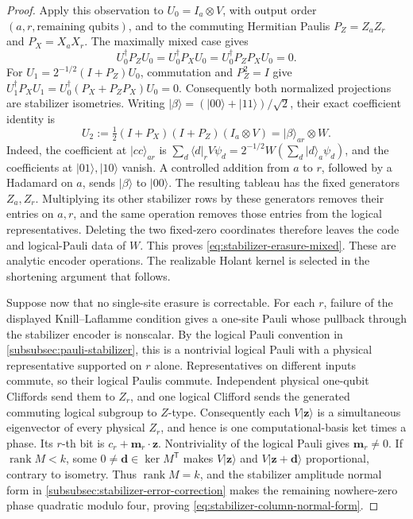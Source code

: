 \documentclass[11pt,letterpaper,onecolumn]{article}
\theoremstyle{plain}
\theoremstyle{definition}
\theoremstyle{remark}
\newcommand{\rank}{\operatorname{rank}}
\begin{document}
\begin{proof}
Apply this observation to \(U_0=I_a\otimes V\), with output order
\((a,r,\text{remaining qubits})\), and to the commuting Hermitian Paulis
\(P_Z=Z_aZ_r\) and \(P_X=X_aX_r\).  The maximally mixed case gives
\[
 U_0^\dagger P_ZU_0=U_0^\dagger P_XU_0
 =U_0^\dagger P_ZP_XU_0=0.
\]
For \(U_1=2^{-1/2}(I+P_Z)U_0\), commutation and \(P_Z^2=I\) give
\(U_1^\dagger P_XU_1=U_0^\dagger(P_X+P_ZP_X)U_0=0\).
Consequently both normalized projections are stabilizer isometries.
Writing \(\lvert\beta\rangle=(\lvert00\rangle+\lvert11\rangle)/\sqrt2\),
their exact coefficient identity is
\[
 U_2:=\tfrac12(I+P_X)(I+P_Z)(I_a\otimes V)
      =\lvert\beta\rangle_{ar}\otimes W.
\]
Indeed, the coefficient at \(\lvert cc\rangle_{ar}\) is
\(\sum_d\langle d\rvert_rV\psi_d
 =2^{-1/2}W(\sum_d\lvert d\rangle_a\psi_d)\),
and the coefficients at \(\lvert01\rangle,\lvert10\rangle\) vanish.
A controlled addition from \(a\) to \(r\), followed by a Hadamard on
\(a\), sends \(\lvert\beta\rangle\) to \(\lvert00\rangle\).
The resulting tableau has the fixed generators \(Z_a,Z_r\).
Multiplying its other stabilizer rows by these generators removes their
entries on \(a,r\), and the same operation removes those entries from
the logical representatives.  Deleting the two fixed-zero coordinates
therefore leaves the code and logical-Pauli data of \(W\).
This proves \cref{eq:stabilizer-erasure-mixed}.  These are analytic encoder
operations. The realizable Holant kernel is selected in the shortening
argument that follows.

Suppose now that no single-site erasure is correctable.  For each \(r\),
failure of the displayed Knill--Laflamme condition gives a one-site Pauli
whose pullback through the stabilizer encoder is nonscalar.  By the logical
Pauli convention in \cref{subsubsec:pauli-stabilizer}, this
is a nontrivial logical Pauli with a physical representative supported on
\(r\) alone.  Representatives on
different inputs commute, so their logical Paulis commute.  Independent
physical one-qubit Cliffords send them to \(Z_r\), and one logical Clifford
sends the generated commuting logical subgroup to \(Z\)-type.  Consequently
each \(V\lvert {\mathbf z}\rangle\) is a simultaneous eigenvector of every physical
\(Z_r\), and hence is one computational-basis ket times a phase.  Its
\(r\)-th bit is \(c_r+{\mathbf{m}}_r\cdot {\mathbf z}\). Nontriviality of the logical Pauli gives
\({\mathbf{m}}_r\ne0\).  If \(\rank M<k\), some
\(0\ne {\mathbf d}\in\ker M^{\mathsf T}\) makes \(V\lvert {\mathbf z}\rangle\) and
\(V\lvert {\mathbf z}+{\mathbf d}\rangle\) proportional, contrary to
isometry.  Thus \(\rank M=k\), and the stabilizer amplitude normal form in
\cref{subsubsec:stabilizer-error-correction} makes the remaining
nowhere-zero phase quadratic modulo four, proving
\cref{eq:stabilizer-column-normal-form}.
\end{proof}
\end{document}
